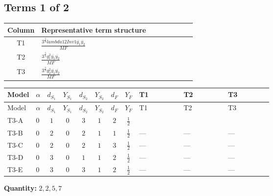 \documentclass[8pt]{article}
\begin{document}
\begin{landscape}
\subsection*{Terms 1 of 2}
\begin{center}
\begin{tabular}{@{}c >{\raggedright\arraybackslash}p{0.82\linewidth}@{}}
\toprule
Column & Representative term structure \\
\midrule
T1 & \(\displaystyle \frac{3^{\frac{3}{4}} lambda12Inv1 \overline{y_{1}} \overline{y_{2}}}{MF}\) \\
\midrule
T2 & \(\displaystyle \frac{3^{\frac{3}{4}} g_{1}^{2} \overline{y_{1}} \overline{y_{2}}}{MF}\) \\
\midrule
T3 & \(\displaystyle \frac{3^{\frac{3}{4}} g_{2}^{2} \overline{y_{1}} \overline{y_{2}}}{MF}\) \\
\midrule
\bottomrule
\end{tabular}
\end{center}
\smallskip
\tiny
\begin{longtable}{@{}llcccccc >{\raggedright\arraybackslash}p{0.21\linewidth} >{\raggedright\arraybackslash}p{0.21\linewidth} >{\raggedright\arraybackslash}p{0.21\linewidth}@{}}
\toprule
Model & $\alpha$ & $d_{S_1}$ & $Y_{S_1}$ & $d_{S_2}$ & $Y_{S_2}$ & $d_F$ & $Y_F$ & T1 & T2 & T3 \\
\midrule
\endfirsthead
\toprule
Model & $\alpha$ & $d_{S_1}$ & $Y_{S_1}$ & $d_{S_2}$ & $Y_{S_2}$ & $d_F$ & $Y_F$ & T1 & T2 & T3 \\
\midrule
\endhead
T3-A & $0$ & $1$ & $0$ & $3$ & $1$ & $2$ & $\frac{1}{2}$ & \scriptsize\adjustbox{max width=\linewidth}{$\begin{gathered} \frac{3^{\frac{3}{4}} lambda12Inv1 \overline{y_{1}} \overline{y_{2}}}{6 MF}\end{gathered}$} & \scriptsize\adjustbox{max width=\linewidth}{$\begin{gathered} \frac{3^{\frac{3}{4}} g_{1}^{2} \overline{y_{1}} \overline{y_{2}}}{8 MF}\end{gathered}$} & \scriptsize\adjustbox{max width=\linewidth}{$\begin{gathered} \frac{17 \cdot 3^{\frac{3}{4}} g_{2}^{2} \overline{y_{1}} \overline{y_{2}}}{24 MF}\end{gathered}$} \\
\midrule
T3-B & $0$ & $2$ & $0$ & $2$ & $1$ & $1$ & $\frac{1}{2}$ & --- & --- & --- \\
\midrule
T3-C & $0$ & $2$ & $0$ & $2$ & $1$ & $3$ & $\frac{1}{2}$ & --- & --- & --- \\
\midrule
T3-D & $0$ & $3$ & $0$ & $1$ & $1$ & $2$ & $\frac{1}{2}$ & --- & --- & --- \\
\midrule
T3-E & $0$ & $3$ & $0$ & $3$ & $1$ & $2$ & $\frac{1}{2}$ & --- & --- & --- \\
\midrule
\bottomrule
\end{longtable}
\clearpage
\noindent\textbf{Quantity: }$\mathrm{2,2,5,7}$\par\smallskip

\end{landscape}
\end{document}
